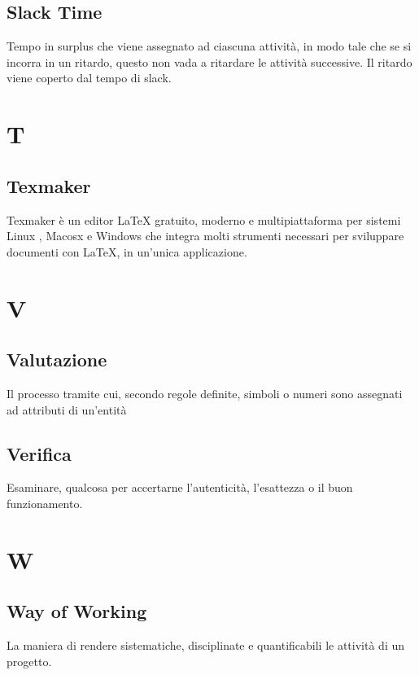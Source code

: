 	\subsection{Slack Time}
	
	Tempo in surplus che viene assegnato ad ciascuna attività, in modo tale che se si incorra in un ritardo, questo non vada a ritardare le attività successive. Il ritardo viene coperto dal tempo di slack.
	
	\section{T}
	\subsection{Texmaker} 
	Texmaker è un editor LaTeX gratuito, moderno e multipiattaforma per sistemi Linux , Macosx e Windows che integra molti strumenti necessari per sviluppare documenti con LaTeX, in un'unica applicazione. 
	
	
	\section{V}

	\subsection{Valutazione} 
	Il processo tramite cui, secondo regole definite, simboli o numeri sono assegnati ad attributi di un’entità
	\subsection{Verifica}
	Esaminare, qualcosa per accertarne l’autenticità, l’esattezza o il buon funzionamento.
	
	\section{W}
	
	\subsection{Way of Working} 
	La maniera di rendere sistematiche, disciplinate e quantificabili le attività di un progetto.
	

